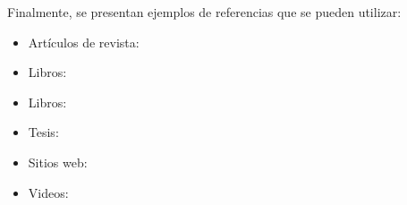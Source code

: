 \documentclass{aleph-revista}
\begin{document}
Finalmente, se presentan ejemplos de referencias que se pueden utilizar:
\begin{itemize}
    \item Artículos de revista: \cite{Bib01}
    \item Libros: \cite{Bib02}
    \item Libros: \cite{Bib06}
    \item Tesis: \cite{Bib03}
    \item Sitios web: \cite{Bib04}
    \item Videos: \cite{Bib05}
\end{itemize}

\printbibliography
\end{document}
